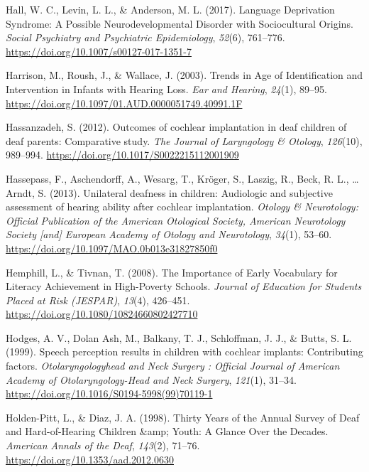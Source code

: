 \documentclass[english,man]{apa6}
\begin{document}
\leavevmode\hypertarget{ref-hall2017}{}%
Hall, W. C., Levin, L. L., \& Anderson, M. L. (2017). Language Deprivation Syndrome: A Possible Neurodevelopmental Disorder with Sociocultural Origins. \emph{Social Psychiatry and Psychiatric Epidemiology}, \emph{52}(6), 761--776. \url{https://doi.org/10.1007/s00127-017-1351-7}

\leavevmode\hypertarget{ref-harrison2003}{}%
Harrison, M., Roush, J., \& Wallace, J. (2003). Trends in Age of Identification and Intervention in Infants with Hearing Loss. \emph{Ear and Hearing}, \emph{24}(1), 89--95. \url{https://doi.org/10.1097/01.AUD.0000051749.40991.1F}

\leavevmode\hypertarget{ref-hassanzadeh2012}{}%
Hassanzadeh, S. (2012). Outcomes of cochlear implantation in deaf children of deaf parents: Comparative study. \emph{The Journal of Laryngology \& Otology}, \emph{126}(10), 989--994. \url{https://doi.org/10.1017/S0022215112001909}

\leavevmode\hypertarget{ref-hassepass2013}{}%
Hassepass, F., Aschendorff, A., Wesarg, T., Kröger, S., Laszig, R., Beck, R. L., \ldots{} Arndt, S. (2013). Unilateral deafness in children: Audiologic and subjective assessment of hearing ability after cochlear implantation. \emph{Otology \& Neurotology: Official Publication of the American Otological Society, American Neurotology Society {[}and{]} European Academy of Otology and Neurotology}, \emph{34}(1), 53--60. \url{https://doi.org/10.1097/MAO.0b013e31827850f0}

\leavevmode\hypertarget{ref-hemphill2008}{}%
Hemphill, L., \& Tivnan, T. (2008). The Importance of Early Vocabulary for Literacy Achievement in High-Poverty Schools. \emph{Journal of Education for Students Placed at Risk (JESPAR)}, \emph{13}(4), 426--451. \url{https://doi.org/10.1080/10824660802427710}

\leavevmode\hypertarget{ref-hodges1999}{}%
Hodges, A. V., Dolan Ash, M., Balkany, T. J., Schloffman, J. J., \& Butts, S. L. (1999). Speech perception results in children with cochlear implants: Contributing factors. \emph{Otolaryngologyhead and Neck Surgery : Official Journal of American Academy of Otolaryngology-Head and Neck Surgery}, \emph{121}(1), 31--34. \url{https://doi.org/10.1016/S0194-5998(99)70119-1}

\leavevmode\hypertarget{ref-holden-pitt1998}{}%
Holden-Pitt, L., \& Diaz, J. A. (1998). Thirty Years of the Annual Survey of Deaf and Hard-of-Hearing Children \&amp; Youth: A Glance Over the Decades. \emph{American Annals of the Deaf}, \emph{143}(2), 71--76. \url{https://doi.org/10.1353/aad.2012.0630}
\end{document}
